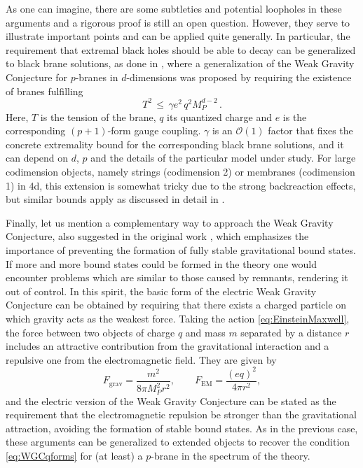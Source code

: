 \documentclass[11pt,a4paper]{article}
\begin{document}
As one can imagine, there are some subtleties and potential loopholes in these arguments and a rigorous proof  is still an open question. 
However, they serve to illustrate important points and can be applied quite generally. In particular, the requirement that extremal black holes should be able to decay can be generalized to black brane solutions, as done in \cite{Heidenreich:2015nta}, where a generalization of the Weak Gravity Conjecture for $p$-branes in $d$-dimensions was proposed by requiring the existence of branes fulfilling
\begin{equation}
      T^{2} \, \leq \, \gamma e^2 \,  q^{2} M_P^{d-2}\, .
    \label{eq:WGCqforms}
\end{equation}
Here, $T$ is the tension of the brane, $q$ its quantized charge and $e$ is the corresponding $(p+1)$-form gauge coupling. $\gamma$ is an $\mathcal{O} (1)$ factor that fixes the concrete extremality bound for the corresponding black brane solutions, and it can depend on $d$, $p$ and the details of the particular model under study. For large codimension objects, namely strings (codimension 2) or membranes (codimension 1) in 4d, this extension is somewhat tricky due to the strong backreaction effects, but similar bounds apply as discussed in detail in \cite{Lanza:2020qmt,Lanza:2021qsu}. 

Finally, let us mention a complementary way to approach the Weak Gravity Conjecture, also suggested in the original work \cite{ArkaniHamed:2006dz}, which emphasizes the importance of preventing the formation of fully stable gravitational bound states. If more and more bound states could be formed in the theory one would encounter problems which are similar to those caused by remnants, rendering it out of control. In this spirit, the basic form of the electric Weak Gravity Conjecture can be obtained by requiring that there exists a charged particle on which gravity acts as the weakest force. Taking the action \eqref{eq:EinsteinMaxwell}, the force between two objects of charge $q$ and mass $m$ separated by a distance $r$ includes an attractive contribution from the gravitational interaction and a repulsive one from the electromagnetic field. They are given by 
\begin{equation}
F_{\text {grav}}=\frac{m^{2}}{8 \pi M_{P}^{2} r^{2}}, \qquad F_{\mathrm{EM}}=\frac{(e q)^{2}}{4 \pi r^{2}},
\end{equation}
and the electric version of the Weak Gravity Conjecture can be stated as the requirement that the electromagnetic repulsion be stronger than the gravitational attraction, avoiding the formation of stable bound states. As in the previous case, these arguments can be generalized to extended objects to recover the condition \eqref{eq:WGCqforms} for (at least) a $p$-brane in the spectrum of the theory. 
\end{document}
